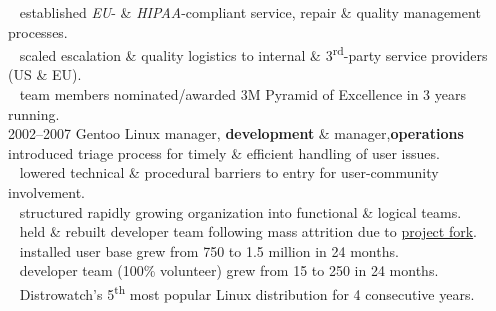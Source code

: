 \documentclass[]{friggeri-cv} %
\begin{document}
\begin{entrylist}
{{\tiny {}} ~ established \emph{EU}- \& \emph{HIPAA}-compliant service, repair \& quality management processes.\\
{\tiny {}} ~ scaled escalation \& quality logistics to internal \& 3\textsuperscript{rd}-party service providers (US \& EU).\\
{\tiny {}} ~ team members nominated/awarded 3M Pyramid of Excellence in 3 years running.\\}
\entry
{2002--2007}
{Gentoo Linux}
{manager, {\textbf{\color{DarkGray}development}} \& manager,{\textbf{\color{DarkGray}operations}}}
{{\tiny {}} ~ introduced triage process for timely \& efficient handling of user issues.\\
{\tiny {}} ~ lowered technical \& procedural barriers to entry for user-community involvement.\\
{\tiny {}} ~ structured rapidly growing organization into functional \& logical teams.\\

{\tiny {}} ~ held \& rebuilt developer team following mass attrition due to \href{http://www.gentoo.org/news/en/gwn/20030630-newsletter.xml}{project fork}.\\

{\tiny {}} ~ installed user base grew from 750 to 1.5 million in 24 months.\\
{\tiny {}} ~ developer team (100\% volunteer) grew from 15 to 250 in 24 months.\\
{\tiny {}} ~ Distrowatch's 5\textsuperscript{th} most popular Linux distribution for 4 consecutive years.}
\end{entrylist}
\end{document}
